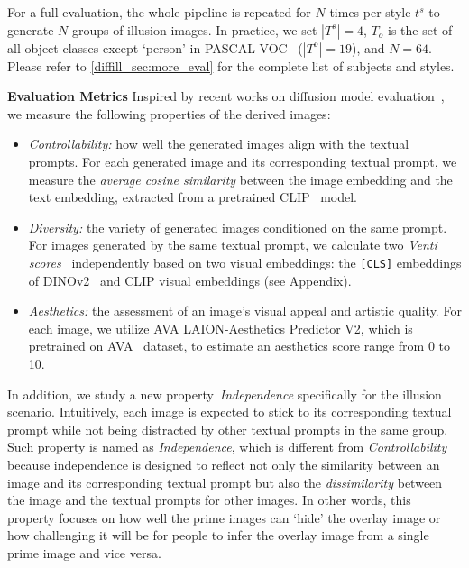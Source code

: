 For a full evaluation, the whole pipeline is repeated for $N$ times per style $t^s$ to generate $N$ groups of illusion images.
In practice, we set $|T^s| = 4$, $T_o$ is the set of all object classes except `person' in PASCAL VOC~\cite{everingham2010pascal} ($|T^o|=19$), and $N=64$.
Please refer to \cref{diffill_sec:more_eval} for the complete list of subjects and styles.

\noindent\textbf{Evaluation Metrics} \quad Inspired by recent works on diffusion model evaluation~\cite{yeh2023navigating, lee2023holistic}, we measure the following properties of the derived images:

\begin{itemize}
    \item \textit{Controllability:} how well the generated images align with the textual prompts. For each generated image and its corresponding textual prompt, we measure the \textit{average cosine similarity} between the image embedding and the text embedding, extracted from a pretrained CLIP~\cite{radford2021learning} model.
    \item \textit{Diversity:} the variety of generated images conditioned on the same prompt. For images generated by the same textual prompt, we calculate two \textit{Venti scores}~\cite{friedman2022vendi} independently based on two visual embeddings: the \texttt{[CLS]} embeddings of DINOv2~\cite{oquab2023dinov2} and CLIP visual embeddings (see Appendix).
    \item \textit{Aesthetics:} the assessment of an image's visual appeal and artistic quality. For each image, we utilize AVA LAION-Aesthetics Predictor V2, which is pretrained on AVA~\cite{murray2012ava} dataset, to estimate an aesthetics score range from 0 to 10.
\end{itemize}

In addition, we study a new property~\textit{Independence} specifically for the illusion scenario.
Intuitively, each image is expected to stick to its corresponding textual prompt while not being distracted by other textual prompts in the same group.
Such property is named as \textit{Independence}, which is different from \textit{Controllability} because independence is designed to reflect not only the similarity between an image and its corresponding textual prompt but also the \textit{dissimilarity} between the image and the textual prompts for other images.
In other words, this property focuses on how well the prime images can `hide' the overlay image or how challenging it will be for people to infer the overlay image from a single prime image and vice versa.


